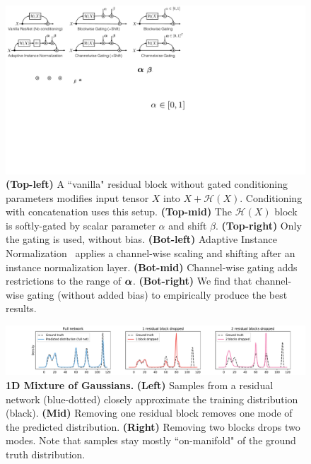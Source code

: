 \begin{figure}[t]
    \centering
    \includegraphics[width=1.\linewidth]{paper_images/arch_gate2.pdf}
    \caption{
    {\bf (Top-left)} A ``vanilla" residual block without gated conditioning parameters modifies input tensor $X$ into $X+\mathcal{H}(X)$. Conditioning with concatenation uses this setup. {\bf (Top-mid)} The $\mathcal{H}(X)$ block is softly-gated by scalar parameter $\alpha$ and shift $\beta$. {\bf (Top-right)} Only the gating is used, without bias. {\bf (Bot-left)} Adaptive Instance Normalization~\cite{huang2017arbitrary} applies a channel-wise scaling and shifting after an instance normalization layer. {\bf (Bot-mid)} Channel-wise gating adds restrictions to the range of $\mbox{\boldmath $\alpha$}$. {\bf (Bot-right)} We find that channel-wise gating (without added bias) to empirically produce the best results.\label{fig:arch-gate}
    \vspace{-2mm}
    }
\end{figure}


\begin{figure}[t]
    \centering
    \includegraphics[width=\linewidth,trim={2.6cm 0 1.8cm 0},clip]{paper_images/mog.pdf}
    \caption{{\bf 1D Mixture of Gaussians.} {\bf (Left)} Samples from a residual network (blue-dotted) closely approximate the training distribution (black). {\bf (Mid)} Removing one residual block removes one mode of the predicted distribution. {\bf (Right)} Removing two blocks drops two modes. Note that samples stay mostly ``on-manifold" of the ground truth distribution.
    }\label{fig:onedexperiment}
\end{figure}

